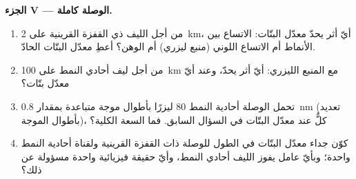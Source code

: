 \begin{problem}
\medskip
\noindent\textbf{الجزء V --- الوصلة كاملة.}
\begin{enumerate}[resume]
  \item من أجل الليف ذي القفزة القرينية على \qty{2}{km}، أيّ أثر يحدّ
        معدّل البتّات: الاتساع بين الأنماط أم الاتساع اللوني (منبع
        ليزري) أم الوهن؟ أعطِ معدّل البتّات الحادّ.
  \item من أجل ليف أحادي النمط على \qty{100}{km} مع المنبع
        الليزري: أيّ أثر يحدّ، وعند أيّ معدّل بتّات؟
  \item تحمل الوصلة أحادية النمط $80$ ليزرًا بأطوال موجة
        متباعدة بمقدار \qty{0.8}{nm} (تعديد بأطوال الموجة)، كلٌّ عند معدّل
        البتّات في السؤال السابق. فما السعة الكلية؟
  \item كوّن جداء معدّل البتّات في الطول للوصلة ذات القفزة القرينية
        ولقناة أحادية النمط واحدة؛ وبأيّ عامل يفوز الليف
        أحادي النمط، وأيّ حقيقة فيزيائية واحدة مسؤولة عن ذلك؟
\end{enumerate}
\end{problem}
